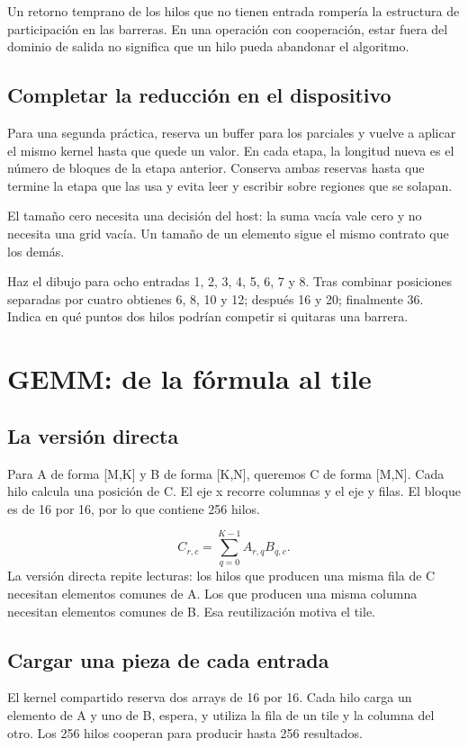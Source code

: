 \documentclass[12pt,a4paper,oneside]{report}
\begin{document}
Un retorno temprano de los hilos que no tienen entrada rompería la estructura de participación en las barreras. En una operación con cooperación, estar fuera del dominio de salida no significa que un hilo pueda abandonar el algoritmo.

\section{Completar la reducción en el dispositivo}
Para una segunda práctica, reserva un buffer para los parciales y vuelve a aplicar el mismo kernel hasta que quede un valor. En cada etapa, la longitud nueva es el número de bloques de la etapa anterior. Conserva ambas reservas hasta que termine la etapa que las usa y evita leer y escribir sobre regiones que se solapan.

El tamaño cero necesita una decisión del host: la suma vacía vale cero y no necesita una grid vacía. Un tamaño de un elemento sigue el mismo contrato que los demás.

\begin{practica}
Haz el dibujo para ocho entradas 1, 2, 3, 4, 5, 6, 7 y 8. Tras combinar posiciones separadas por cuatro obtienes 6, 8, 10 y 12; después 16 y 20; finalmente 36. Indica en qué puntos dos hilos podrían competir si quitaras una barrera.

\end{practica}
\chapter{GEMM: de la fórmula al tile}
\section{La versión directa}
Para A de forma [M,K] y B de forma [K,N], queremos C de forma [M,N]. Cada hilo calcula una posición de C. El eje x recorre columnas y el eje y filas. El bloque es de 16 por 16, por lo que contiene 256 hilos.

\[
C_{r,c}=\sum_{q=0}^{K-1} A_{r,q}B_{q,c}.
\]
La versión directa repite lecturas: los hilos que producen una misma fila de C necesitan elementos comunes de A. Los que producen una misma columna necesitan elementos comunes de B. Esa reutilización motiva el tile.

\section{Cargar una pieza de cada entrada}
El kernel compartido reserva dos arrays de 16 por 16. Cada hilo carga un elemento de A y uno de B, espera, y utiliza la fila de un tile y la columna del otro. Los 256 hilos cooperan para producir hasta 256 resultados.
\end{document}

